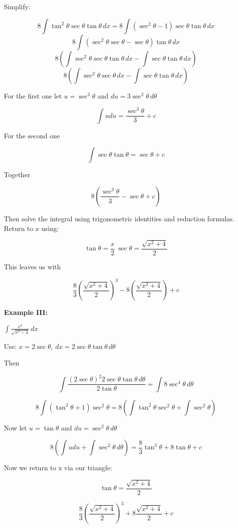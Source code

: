 Simplify:

\[
    8\int \tan^{2}\theta\sec\theta\tan\theta \,dx = 8\int (\sec^2\theta - 1)\sec\theta\tan\theta \,dx 
\]
\[
    8\int (\sec^2\theta\sec\theta - \sec\theta)\tan\theta \,dx 
\]
\[
    8\left(\int \sec^2\theta\sec\theta\tan\theta \,dx - \int\sec\theta\tan\theta \,dx \right) 
\]
\[
    8\left(\int \sec^2\theta\sec\theta \,dx - \int\sec\theta\tan\theta \,dx \right) 
\]

For the first one let \(u = \sec^3\theta\) and \(du = 3\sec^2\theta\,d\theta\) 

\[
    \int udu = \frac{\sec^3\theta}{3} + c
\]

For the second one

\[
    \int \sec\theta\tan\theta = \sec\theta + c
\]

Together

\[
    8\left(  \frac{\sec^3\theta}{3} - \sec\theta + c\right)
\]

Then solve the integral using trigonometric identities and reduction formulas. Return to \(x\) using:

\[
    \tan\theta = \frac{x}{2}\ \sec\theta = \frac{\sqrt{x^2 + 4}}{2}
\]

This leaves us with

\[
    \frac{8}{3} {\left(\frac{\sqrt{x^2 + 4}}{2}\right)}^3 - 8 \left( \frac{\sqrt{x^2 + 4}}{2}\right) + c
\]

\textbf{Example III:} 

\( \int \frac{x^3}{\sqrt{x^4 - 4}} \,dx \)

Use: \(x = 2\sec \theta, \ dx = 2\sec \theta \tan \theta \,d\theta \)

Then

\[
    \int \frac{{(2\sec\theta)}^2 2\sec\theta \tan\theta \,d\theta}{2\tan\theta} = \int 8\sec^4 \theta\,d\theta
\]

\[
    8\int(\tan^2\theta + 1)\sec^2\theta = 8\left(\int\tan^2\theta\sec^2\theta + \int \sec^2\theta \right)
\]

Now let \(u = \tan\theta\) and \(du = \sec^2\theta \,d\theta\)

\[
    8\left( \int udu  + \int \sec^2\theta\,d\theta\right) = 
    \frac{8}{3}\tan^3\theta + 8\tan\theta + c
\]

Now we return to x via our triangle:

\[
    \tan\theta = \frac{\sqrt{x^2 + 4}}{2}
\]

\[
    \frac{8}{3}{\left(\frac{\sqrt{x^2 + 4}}{2}\right)}^3 + 8 \frac{\sqrt{x^2 + 4}}{2} + c
\]

